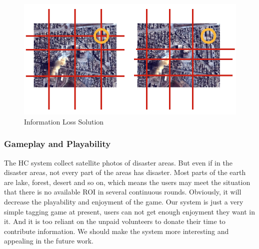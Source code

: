   \begin{figure}[htp]
  \centering
  \includegraphics[width=0.5\columnwidth]{figures/information_loss}
  \caption{Information Loss Solution}
  \label{fig:information_loss}
  \end{figure}

  \subsubsection{Gameplay and Playability}
  The HC system collect satellite photos of disaster areas. But even if in the disaster areas, not every part of the areas has disaster. Most parts of the earth are lake, forest, desert and so on, which means the users may meet the situation that there is no available ROI in several continuous rounds. Obviously, it will decrease the playability and enjoyment of the game.
  Our system is just a very simple tagging game at present, users can not get enough enjoyment they want in it. And it is too reliant on the unpaid volunteers to donate their time to contribute information. We should make the system more interesting and appealing in the future work.
